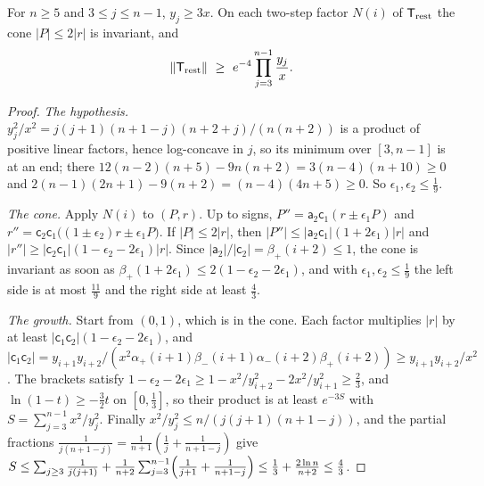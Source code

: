 \begin{lemma}[Cone]\label{lem:v6cone}
For $n\ge5$ and $3\le j\le n-1$, $y_j\ge3x$. On each two-step factor $N(i)$ of
$\mathsf T_{\rm rest}$ the cone $|P|\le2|r|$ is invariant, and
\[
  \|\mathsf T_{\rm rest}\|\ \ge\ e^{-4}\prod_{j=3}^{n-1}\frac{y_j}x .
\]
\end{lemma}

\begin{proof}
\emph{The hypothesis.} $y_j^2/x^2=j(j+1)(n+1-j)(n+2+j)/(n(n+2))$ is a product of positive
linear factors, hence log-concave in $j$, so its minimum over $[3,n-1]$ is at an end; there
$12(n-2)(n+5)-9n(n+2)=3(n-4)(n+10)\ge0$ and $2(n-1)(2n+1)-9(n+2)=(n-4)(4n+5)\ge0$. So
$\epsilon_1,\epsilon_2\le\frac19$.

\emph{The cone.} Apply $N(i)$ to $(P,r)$. Up to signs,
$P''=\mathsf a_2\mathsf c_1(r\pm\epsilon_1P)$ and
$r''=\mathsf c_2\mathsf c_1\bigl((1\pm\epsilon_2)r\pm\epsilon_1P\bigr)$. If $|P|\le2|r|$, then
$|P''|\le|\mathsf a_2\mathsf c_1|(1+2\epsilon_1)|r|$ and
$|r''|\ge|\mathsf c_2\mathsf c_1|(1-\epsilon_2-2\epsilon_1)|r|$. Since
$|\mathsf a_2|/|\mathsf c_2|=\beta_+(i+2)\le1$, the cone is invariant as soon as
$\beta_+(1+2\epsilon_1)\le2(1-\epsilon_2-2\epsilon_1)$, and with $\epsilon_1,\epsilon_2\le\frac19$
the left side is at most $\frac{11}9$ and the right side at least $\frac43$.

\emph{The growth.} Start from $(0,1)$, which is in the cone. Each factor multiplies $|r|$ by
at least $|\mathsf c_1\mathsf c_2|(1-\epsilon_2-2\epsilon_1)$, and
$|\mathsf c_1\mathsf c_2|=y_{i+1}y_{i+2}/(x^2\alpha_+(i+1)\beta_-(i+1)\alpha_-(i+2)\beta_+(i+2))
\ge y_{i+1}y_{i+2}/x^2$. The brackets satisfy
$1-\epsilon_2-2\epsilon_1\ge1-x^2/y_{i+2}^2-2x^2/y_{i+1}^2\ge\frac23$, and
$\ln(1-t)\ge-\frac32t$ on $[0,\frac13]$, so their product is at least $e^{-3S}$ with
$S=\sum_{j=3}^{n-1}x^2/y_j^2$. Finally $x^2/y_j^2\le n/(j(j+1)(n+1-j))$, and the partial
fractions $\frac1{j(n+1-j)}=\frac1{n+1}(\frac1j+\frac1{n+1-j})$ give
$S\le\sum_{j\ge3}\frac1{j(j+1)}+\frac1{n+2}\sum_{j=3}^{n-1}\Bigl(\frac1{j+1}+\frac1{n+1-j}\Bigr)
\le\frac13+\frac{2\ln n}{n+2}\le\frac43$.
\end{proof}

